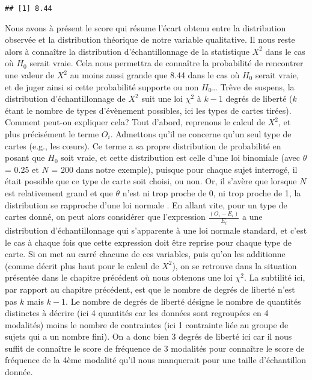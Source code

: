 \documentclass[
  french,
]{book}
\begin{document}
\begin{verbatim}
## [1] 8.44
\end{verbatim}

Nous avons à présent le score qui résume l'écart obtenu entre la distribution observée et la distribution théorique de notre variable qualitative. Il nous reste alors à connaître la distribution d'échantillonnage de la statistique \(X^2\) dans le cas où \(H_{0}\) serait vraie. Cela nous permettra de connaître la probabilité de rencontrer une valeur de \(X^2\) au moins aussi grande que 8.44 dans le cas où \(H_{0}\) serait vraie, et de juger ainsi si cette probabilité supporte ou non \(H_{0}\)\ldots{} Trêve de suspens, la distribution d'échantillonnage de \(X^2\) suit une loi \(\chi^2\) à \(k-1\) degrés de liberté (\(k\) étant le nombre de types d'évènement possibles, ici les types de cartes tirées). Comment peut-on expliquer cela? Tout d'abord, reprenons le calcul de \(X^2\), et plus précisément le terme \(O_{i}\). Admettons qu'il ne concerne qu'un seul type de cartes (e.g., les cœurs). Ce terme a sa propre distribution de probabilité en posant que \(H_{0}\) soit vraie, et cette distribution est celle d'une loi binomiale (avec \(\theta\) = 0.25 et \(N\) = 200 dans notre exemple), puisque pour chaque sujet interrogé, il était possible que ce type de carte soit choisi, ou non. Or, il s'avère que lorsque \(N\) est relativement grand et que \(\theta\) n'est ni trop proche de 0, ni trop proche de 1, la distribution se rapproche d'une loi normale \autocite{navarroLearningStatistics2018}. En allant vite, pour un type de cartes donné, on peut alors considérer que l'expression \(\frac{(O_{i} - E_{i})}{E_{i}}\) a une distribution d'échantillonnage qui s'apparente à une loi normale standard, et c'est le cas à chaque fois que cette expression doit être reprise pour chaque type de carte. Si on met au carré chacune de ces variables, puis qu'on les additionne (comme décrit plus haut pour le calcul de \(X^2\)), on se retrouve dans la situation présentée dans le chapitre précédent où nous obtenons une loi \(\chi^2\). La subtilité ici, par rapport au chapitre précédent, est que le nombre de degrés de liberté n'est pas \(k\) mais \(k-1\). Le nombre de degrés de liberté désigne le nombre de quantités distinctes à décrire (ici 4 quantités car les données sont regroupées en 4 modalités) moins le nombre de contraintes (ici 1 contrainte liée au groupe de sujets qui a un nombre fini). On a donc bien 3 degrés de liberté ici car il nous suffit de connaître le score de fréquence de 3 modalités pour connaître le score de fréquence de la 4ème modalité qu'il nous manquerait pour une taille d'échantillon donnée.
\end{document}
